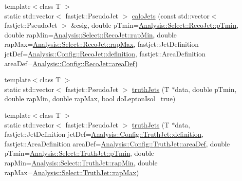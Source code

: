 \begin{DoxyCompactItemize}
\item 
{\footnotesize template$<$class T $>$ }\\static std\+::vector$<$ fastjet\+::\+Pseudo\+Jet $>$ \hyperlink{structAnalysisHelper_a40295de22cc9dc83894510aa373763e2}{calo\+Jets} (const std\+::vector$<$ fastjet\+::\+Pseudo\+Jet $>$ \&csig, double p\+Tmin=\hyperlink{namespaceAnalysis_1_1Select_1_1RecoJet_af7dbdbda43aa5be9d83a31fc3b41ac14}{Analysis\+::\+Select\+::\+Reco\+Jet\+::p\+Tmin}, double rap\+Min=\hyperlink{namespaceAnalysis_1_1Select_1_1RecoJet_a5e056f65c8f2f9b0ad358760fc0f4481}{Analysis\+::\+Select\+::\+Reco\+Jet\+::rap\+Min}, double rap\+Max=\hyperlink{namespaceAnalysis_1_1Select_1_1RecoJet_ada7395a2f03291db87208b68e4030d92}{Analysis\+::\+Select\+::\+Reco\+Jet\+::rap\+Max}, fastjet\+::\+Jet\+Definition jet\+Def=\hyperlink{namespaceAnalysis_1_1Config_1_1RecoJet_ae0c23bbd5e0420037cbbb9f7929da17f}{Analysis\+::\+Config\+::\+Reco\+Jet\+::definition}, fastjet\+::\+Area\+Definition area\+Def=\hyperlink{namespaceAnalysis_1_1Config_1_1RecoJet_a327f69062972ac03aac1dd7464fe778b}{Analysis\+::\+Config\+::\+Reco\+Jet\+::area\+Def})
\item 
{\footnotesize template$<$class T $>$ }\\static std\+::vector$<$ fastjet\+::\+Pseudo\+Jet $>$ \hyperlink{structAnalysisHelper_ab026a5fb00af407a144f3cd990f00fe4}{truth\+Jets} (T $\ast$data, double p\+Tmin, double rap\+Min, double rap\+Max, bool do\+Lepton\+Isol=true)
\item 
{\footnotesize template$<$class T $>$ }\\static std\+::vector$<$ fastjet\+::\+Pseudo\+Jet $>$ \hyperlink{structAnalysisHelper_af341b0497231263281ad0b12cd15e832}{truth\+Jets} (T $\ast$data, fastjet\+::\+Jet\+Definition jet\+Def=\hyperlink{namespaceAnalysis_1_1Config_1_1TruthJet_a15280a9c639a88c02bf1e3794b6ec29d}{Analysis\+::\+Config\+::\+Truth\+Jet\+::definition}, fastjet\+::\+Area\+Definition area\+Def=\hyperlink{namespaceAnalysis_1_1Config_1_1TruthJet_aaaf974e7a2655200c6cd5aa5b6f86f90}{Analysis\+::\+Config\+::\+Truth\+Jet\+::area\+Def}, double p\+Tmin=\hyperlink{namespaceAnalysis_1_1Select_1_1TruthJet_a861b3fa8b899e322a5f8a8d04a707220}{Analysis\+::\+Select\+::\+Truth\+Jet\+::p\+Tmin}, double rap\+Min=\hyperlink{namespaceAnalysis_1_1Select_1_1TruthJet_ac25d5e19383f354b51fb4eec2d0b5d97}{Analysis\+::\+Select\+::\+Truth\+Jet\+::rap\+Min}, double rap\+Max=\hyperlink{namespaceAnalysis_1_1Select_1_1TruthJet_a1f15c201f6726e1fb1251c65df7204cf}{Analysis\+::\+Select\+::\+Truth\+Jet\+::rap\+Max})
\item 

\end{DoxyCompactItemize}
